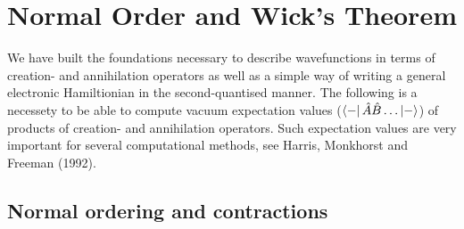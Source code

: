 \section{Normal Order and Wick's Theorem}

    We have built the foundations necessary to describe wavefunctions in terms
    of creation- and annihilation operators as well as a simple way of writing
    a general electronic Hamiltionian in the second-quantised manner. The following
    is a necessety to be able to compute vacuum expectation values 
    ($\bra{-} \hat{A} \hat{B} \dots \ket{-}$) of products of creation- 
    and annihilation operators. Such expectation values are very important for 
    several computational methods, see Harris, Monkhorst and Freeman 
    (1992)\cite{harris1992algebraic}.

        \subsection{Normal ordering and contractions}

